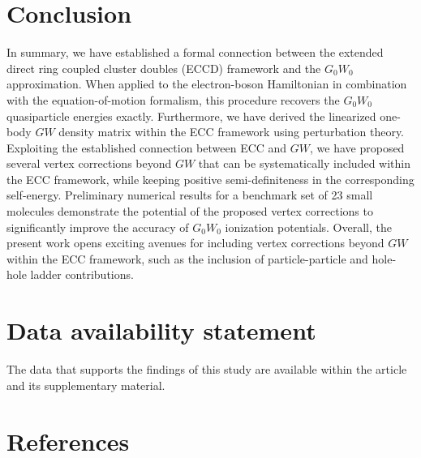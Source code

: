 \documentclass[aip,jcp,reprint,noshowkeys,superscriptaddress]{revtex4-2}
\begin{document}
\section{Conclusion}
\label{sec:conclusion}
In summary, we have established a formal connection between the extended direct ring coupled cluster doubles (ECCD) framework and the $G_0W_0$ approximation.
When applied to the electron-boson Hamiltonian in combination with the equation-of-motion formalism, this procedure recovers the $G_0W_0$ quasiparticle energies exactly.
Furthermore, we have derived the linearized one-body $GW$ density matrix within the ECC framework using perturbation theory.
Exploiting the established connection between ECC and $GW$, we have proposed several vertex corrections beyond $GW$ that can be systematically included within the ECC framework,
while keeping positive semi-definiteness in the corresponding self-energy.
Preliminary numerical results for a benchmark set of 23 small molecules demonstrate the potential of the proposed vertex corrections to significantly improve the accuracy of $G_0W_0$ ionization potentials.
Overall, the present work opens exciting avenues for including vertex corrections beyond $GW$ within the ECC framework, such as the inclusion
of particle-particle and hole-hole ladder contributions.



\section*{Data availability statement}
The data that supports the findings of this study are available within the article and its supplementary material.
 
\section*{References}


\end{document}
